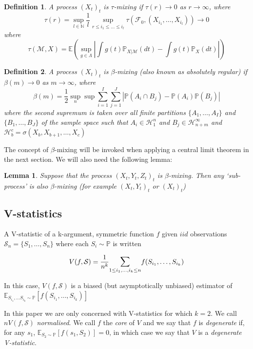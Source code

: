 \documentclass[]{article}
\newtheorem{definition}{Definition}
\newtheorem{lemma}{Lemma}
\begin{document}
\begin{definition}
A process $(X_t)_{t}$ is \emph{$\tau$-mixing} if $\tau(r) \longrightarrow 0$ as $r\longrightarrow \infty$, where
\[\tau(r) = \sup_{l\in \mathbb{N}} \frac{1}{l} \sup_{r\leq i_1 \leq \ldots \leq i_l} \tau(\mathcal{F}_0,(X_{i_1}, \ldots, X_{i_l})) \longrightarrow 0\]
where
\[ \tau(\mathcal{M},X) = \mathbb{E} (\sup_{g \in \Lambda} | \int g(t) \mathbb{P}_{X|\mathcal{M}}(dt) -  \int g(t) \mathbb{P}_{X}(dt) |)\]
\end{definition}

\begin{definition}
A process $(X_t)_{t}$ is \emph{$\beta$-mixing} (also known as \emph{absolutely regular}) if $\beta(m) \longrightarrow 0$ as $m\longrightarrow \infty$, where
\[ \beta(m) = \frac{1}{2} \sup_n \sup \sum_{i=1}^I \sum_{j=1}^J | \mathbb{P}(A_i \cap B_j) - \mathbb{P}(A_i)\mathbb{P}(B_j)| \]
where the second supremum is taken  over all finite partitions $\{A_1,\ldots, A_I \}$ and  $\{B_1,\ldots, B_J\}$ of the sample space such that $A_i \in \mathcal{H}_1^n$ and $B_j \in \mathcal{H}_{n+m}^\infty$ and $\mathcal{H}_b^c = \sigma(X_b,X_{b+1},\ldots,X_{c})$
\end{definition}

The concept of $\beta$-mixing will be invoked when applying a central limit theorem in the next section. We will also need the following lemma:

\begin{lemma}\label{lemma:beta}
Suppose that the process $(X_t,Y_t,Z_t)_t$ is $\beta$-mixing. Then any `sub-process' is also $\beta$-mixing (for example $(X_t,Y_t)_t$ or $(X_t)_t$)
\end{lemma}

\subsection{V-statistics}
A V-statistic of a k-argument, symmetric function $f$ given $iid$ observations $\mathcal{S}_n = \{S_1,\ldots,S_n\}$ where each $S_i \sim \mathbb{P}$ is written

\[ V(f,\mathcal{S}) =  \frac{1}{n^k} \mathlarger{\sum}_{1\leq i_1,\ldots, i_k \leq n} f(S_{i_1},\ldots,S_{i_k})\]

In this case, $V(f,\mathcal{S})$ is a biased (but asymptotically unbiased) estimator of $\mathbb{E}_{S_{i_1},\ldots S_{i_k} \sim \mathbb{P}}[f(S_{i_1},\ldots,S_{i_k})]$

In this paper we are only concerned with V-statistics for which $k=2$. We call $nV(f,\mathcal{S})$ \emph{normalised}. We call $f$ the \emph{core} of $V$ and we say that $f$ is \emph{degenerate} if, for any $s_1$, $\mathbb{E}_{S_2 \sim \mathbb{P}}[f(s_1,S_2)] = 0$, in which case we say that $V$ is a \emph{degenerate V-statistic}.
\end{document}
